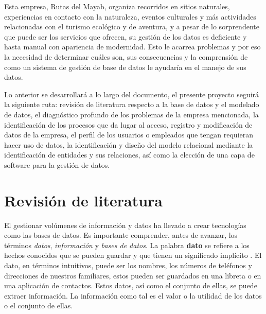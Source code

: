 \documentclass[12pt]{article}
\begin{document}
Esta empresa, Rutas del Mayab, organiza recorridos en sitios naturales, experiencias en contacto con la naturaleza, eventos culturales y más actividades relacionadas con el turismo ecológico y de aventura, y a pesar de lo sorprendente que puede ser los servicios que ofrecen, su gestión de los datos es deficiente y hasta manual con apariencia de modernidad. Esto le acarrea problemas y por eso la necesidad de determinar cuáles son, sus consecuencias y la comprensión de como un sistema de gestión de base de datos le ayudaría en el manejo de sus datos.
\newline

Lo anterior se desarrollará a lo largo del documento, el presente proyecto seguirá la siguiente ruta: revisión de literatura respecto a la base de datos y el modelado de datos, el diagnóstico profundo de los problemas de la empresa mencionada, la identificación de los procesos que da lugar al acceso, registro y modificación de datos de la empresa, el perfil de los usuarios o empleados que tengan requieran hacer uso de datos, la identificación y diseño del modelo relacional mediante la identificación de entidades y sus relaciones, así como la elección de una capa de software para la gestión de datos. 
\newpage

\section*{\centering Revisión de literatura}


El gestionar volúmenes de información y datos ha llevado a crear tecnologías como las bases de datos. Es importante comprender, antes de avanzar, los términos \textit{datos}, \textit{información} y \textit{bases de datos}. La palabra \textbf{dato} se refiere a los hechos conocidos que se pueden guardar y que tienen un significado implícito \parencite{Elmasri2007}. El dato, en términos intuitivos, puede ser los nombres, los números de teléfonos y direcciones de nuestros familiares, estos pueden ser guardados en una libreta o en una aplicación de contactos. Estos datos, así como el conjunto de ellas, se puede extraer información. La información como tal es el valor o la utilidad de los datos o el conjunto de ellas. 
\newline
\end{document}
